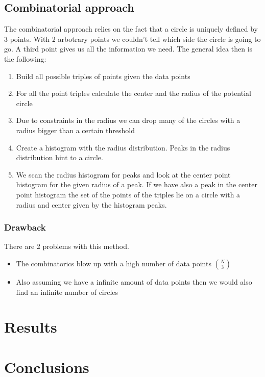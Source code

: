 \documentclass[10pt,twoside]{scrreprt}
\begin{document}

\section{Combinatorial approach}

The combinatorial approach relies on the fact that a circle is uniquely defined by 3 points. With 2 arbotrary points we couldn't tell which side the circle is
going to go. A third point gives us all the information we need. The general idea then is the following:

\begin{enumerate}
\item Build all possible triples of points given the data points
\item For all the point triples calculate the center and the radius of the potential circle
\item Due to constraints in the radius we can drop many of the circles with a radius bigger than a certain threshold
\item Create a histogram with the radius distribution. Peaks in the radius distribution hint to a circle.
\item We scan the radius histogram for peaks and look at the center point histogram for the given radius of a peak. If we have also a peak in the center point histogram
      the set of the points of the triples lie on a circle with a radius and center given by the histogram peaks.
\end{enumerate}

\subsection{Drawback}
	

There are 2 problems with this method.

\begin{itemize}
\item The combinatorics blow up with a high number of data points \( \binom{N}{3} \)
\item Also assuming we have a infinite amount of data points then we would also find an infinite number of circles
\end{itemize}

\chapter{Results}


\chapter{Conclusions} %
\label{cha:conclusions}


\printbibliography
\end{document}

